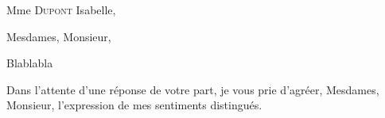 \documentclass[a4paper,12pt,french]{scrlttr2}
\date{}
\begin{document}
\begin{letter}{Mme \textsc{Dupont} Isabelle,}

\opening{Mesdames, Monsieur,}

Blablabla

\closing{Dans l'attente d'une réponse de votre part, je vous prie d'agréer, Mesdames, Monsieur, l'expression de mes sentiments distingués.}
\end{letter}
\end{document}
